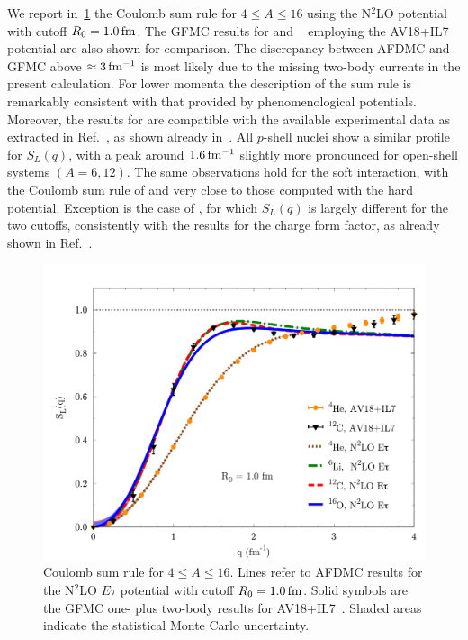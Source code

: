 \documentclass[aps,prc,twocolumn,superscriptaddress,floatfix]{revtex4-1}
\begin{document}
We report in~\cref{fig:sl10} the Coulomb sum rule for $4\le A\le16$ using the N$^2$LO potential
with cutoff $R_0=1.0\,\rm fm$. The GFMC results for  
and ~\cite{Lovato:2013,Lonardoni:2017cvmc} employing the AV18+IL7 potential are also shown for comparison.
The discrepancy between AFDMC and GFMC above $\approx 3\,\rm fm^{-1}$ is most likely due
to the missing two-body currents in the present calculation. For lower momenta the description of the sum rule 
is remarkably consistent with that provided by phenomenological potentials. 
Moreover, the results for  are 
compatible with the available experimental data as extracted in Ref.~\cite{Lovato:2016}, 
as shown already in~\cite{Lonardoni:2017afdmc}. 
All $p$-shell nuclei show a similar profile for $S_L(q)$, with a peak around 
$1.6\,\rm fm^{-1}$ slightly more pronounced for open-shell systems $(A=6,12)$.
The same observations hold for the soft interaction, with the Coulomb sum rule 
of  and  very close to those computed with 
the hard potential. Exception is the case of , for which $S_L(q)$
is largely different for the two cutoffs, consistently with the results for the
charge form factor, as already shown in Ref.~\cite{Lonardoni:2017afdmc}.

\begin{figure}[htb]
\includegraphics[width=\linewidth]{sl.pdf}
\caption[]{Coulomb sum rule for $4\le A\le16$.
Lines refer to AFDMC results for the N$^2$LO $E\tau$ potential with cutoff $R_0=1.0\,\rm fm$.
Solid symbols are the GFMC one- plus two-body results for AV18+IL7~\cite{Lovato:2013,Lonardoni:2017cvmc}. 
Shaded areas indicate the statistical Monte Carlo uncertainty.}
\label{fig:sl10}
\end{figure}
\end{document}
